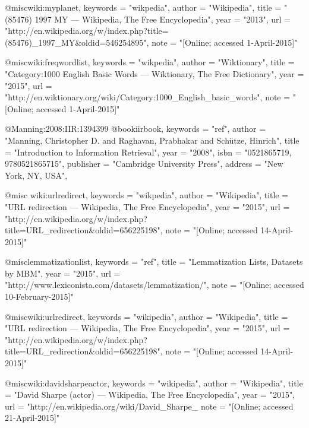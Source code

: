 @misc{wiki:myplanet,
    keywords    =   "wikpedia",
    author      =   "Wikipedia",
    title       =   "(85476) 1997 MY --- Wikipedia{,} The Free Encyclopedia",
    year        =   "2013",
    url         =   "http://en.wikipedia.org/w/index.php?title=(85476)_1997_MY&oldid=546254895",
    note        =   "[Online; accessed 1-April-2015]"
}


@misc{wiki:freqwordlist,
    keywords    =   "wikpedia",
    author      =   "Wiktionary",
    title       =   "Category:1000 English Basic Words --- Wiktionary{,} The Free Dictionary",
    year        =   "2015",
    url         =   "http://en.wiktionary.org/wiki/Category:1000_English_basic_words",
    note        =   "[Online; accessed 1-April-2015]"
}
 
@Manning:2008:IIR:1394399
@book{iirbook,
    keywords    =   "ref",
    author      =   "Manning, Christopher D. and Raghavan, Prabhakar and Sch\"{u}tze, Hinrich",
    title       =   "Introduction to Information Retrieval",
    year        =   "2008",
    isbn        =   "0521865719, 9780521865715",
    publisher   =   "Cambridge University Press",
    address     =   "New York, NY, USA",
} 

@misc{ wiki:urlredirect,
    keywords    =   "wikpedia",
    author      =   "Wikipedia",
    title       =   "URL redirection --- Wikipedia{,} The Free Encyclopedia",
    year        =   "2015",
    url         =   "http://en.wikipedia.org/w/index.php?title=URL_redirection&oldid=656225198",
    note        =   "[Online; accessed 14-April-2015]"
}
 
@misc{lemmatizationlist,
    keywords    =   "ref",
    title       =   "Lemmatization Lists, Datasets by MBM",
    year        =   "2015",
    url         =   "http://www.lexiconista.com/datasets/lemmatization/",
    note        =   "[Online; accessed 10-February-2015]"
}

@misc{wiki:urlredirect,
    keywords    =   "wikipedia",
    author      =   "Wikipedia",
    title       =   "URL redirection --- Wikipedia{,} The Free Encyclopedia",
    year        =   "2015",
    url         =   "http://en.wikipedia.org/w/index.php?title=URL_redirection&oldid=656225198",
    note        =   "[Online; accessed 14-April-2015]"
}
 
@misc{wiki:davidsharpeactor,
    keywords    =   "wikipedia",
    author      =   "Wikipedia",
    title       =   "David Sharpe (actor) --- Wikipedia{,} The Free Encyclopedia",
    year        =   "2015",
    url         =   "http://en.wikipedia.org/wiki/David_Sharpe_%
    note        =   "[Online; accessed 21-April-2015]"
}
 
